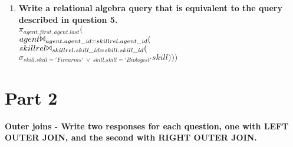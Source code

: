 \documentclass{article}
\begin{document}
\begin{enumerate}
\item
\textbf{Write a relational algebra query that is equivalent to the query described in question 5.\\}
$\pi_{agent.first,agent.last}($\\
$agent \Bowtie_{agent.agent\_id=skillrel.agent\_id} ($\\
$skillrel \Bowtie_{skillrel.skill\_id=skill.skill\_id} ($\\
$\sigma_{skill.skill='Firearms'\; \vee\; skill.skill='Biologist'}skill)))$\\

\end{enumerate}

\section*{Part 2}
\textbf{Outer joins - Write two responses for each question, one with LEFT OUTER JOIN, and the
second with RIGHT OUTER JOIN.}
\end{document}
